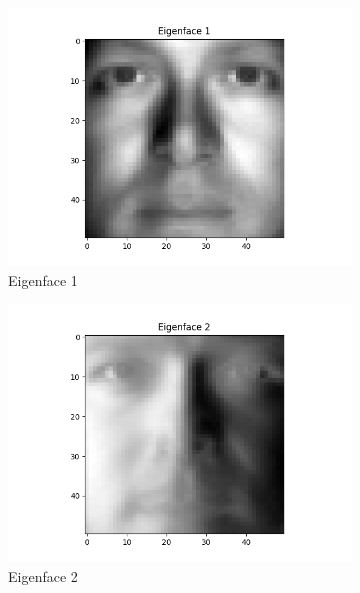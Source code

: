 \documentclass{article}
\begin{document}
\begin{enumerate}[label=(\alph*)]
    \begin{figure}[H]
        \centering
        \begin{subfigure}{0.4\textwidth}
            \includegraphics[width=\textwidth]{eigen1.png}
            \caption{Eigenface 1}
        \end{subfigure}
        \begin{subfigure}{0.4\textwidth}
            \includegraphics[width=\textwidth]{eigen2.png}
            \caption{Eigenface 2}
        \end{subfigure}
        \begin{subfigure}{0.4\textwidth}

\end{subfigure}
\end{figure}
\end{enumerate}
\end{document}
